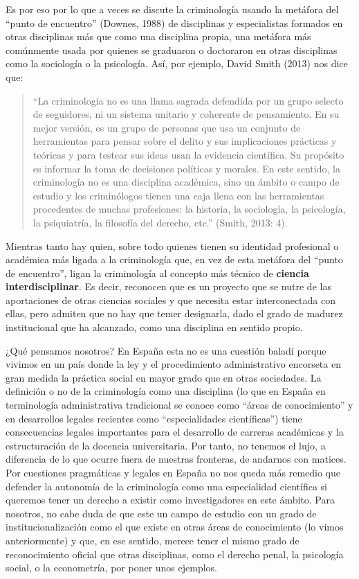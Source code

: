 \documentclass[
  spanish,
  letterpaper,
  DIV=11,
  numbers=noendperiod]{scrreprt}
\begin{document}
Es por eso por lo que a veces se discute la criminología usando la
metáfora del ``punto de encuentro'' (Downes, 1988) de disciplinas y
especialistas formados en otras disciplinas más que como una disciplina
propia, una metáfora más comúnmente usada por quienes se graduaron o
doctoraron en otras disciplinas como la sociología o la psicología. Así,
por ejemplo, David Smith (2013) nos dice que:

\begin{quote}
``La criminología no es una llama sagrada defendida por un grupo selecto
de seguidores, ni un sistema unitario y coherente de pensamiento. En su
mejor versión, es un grupo de personas que usa un conjunto de
herramientas para pensar sobre el delito y sus implicaciones prácticas y
teóricas y para testear sus ideas usan la evidencia científica. Su
propósito es informar la toma de decisiones políticas y morales. En este
sentido, la criminología no es una disciplina académica, sino un ámbito
o campo de estudio y los criminólogos tienen una caja llena con las
herramientas procedentes de muchas profesiones: la historia, la
sociología, la psicología, la psiquiatría, la filosofía del derecho,
etc.'' (Smith, 2013: 4).
\end{quote}

Mientras tanto hay quien, sobre todo quienes tienen su identidad
profesional o académica más ligada a la criminología que, en vez de esta
metáfora del ``punto de encuentro'', ligan la criminología al concepto
más técnico de \textbf{ciencia interdisciplinar}. Es decir, reconocen
que es un proyecto que se nutre de las aportaciones de otras ciencias
sociales y que necesita estar interconectada con ellas, pero admiten que
no hay que temer designarla, dado el grado de madurez institucional que
ha alcanzado, como una disciplina en sentido propio.

¿Qué pensamos nosotros? En España esta no es una cuestión baladí porque
vivimos en un país donde la ley y el procedimiento administrativo
encorseta en gran medida la práctica social en mayor grado que en otras
sociedades. La definición o no de la criminología como una disciplina
(lo que en España en terminología administrativa tradicional se conoce
como ``áreas de conocimiento'' y en desarrollos legales recientes como
``especialidades científicas'') tiene consecuencias legales importantes
para el desarrollo de carreras académicas y la estructuración de la
docencia universitaria. Por tanto, no tenemos el lujo, a diferencia de
lo que ocurre fuera de nuestras fronteras, de andarnos con matices. Por
cuestiones pragmáticas y legales en España no nos queda más remedio que
defender la autonomía de la criminología como una especialidad
científica si queremos tener un derecho a existir como investigadores en
este ámbito. Para nosotros, no cabe duda de que este un campo de estudio
con un grado de institucionalización como el que existe en otras áreas
de conocimiento (lo vimos anteriormente) y que, en ese sentido, merece
tener el mismo grado de reconocimiento oficial que otras disciplinas,
como el derecho penal, la psicología social, o la econometría, por poner
unos ejemplos.
\end{document}
